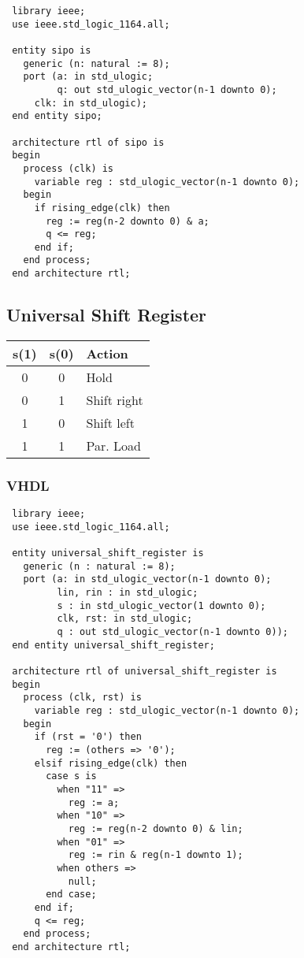 \documentclass[german, 10pt, a4paper, twocolumn]{scrartcl}
\theoremstyle{definition}
\begin{document}
\begin{verbatim}
 library ieee;
 use ieee.std_logic_1164.all;

 entity sipo is
   generic (n: natural := 8);
   port (a: in std_ulogic;
         q: out std_ulogic_vector(n-1 downto 0);
	 clk: in std_ulogic);
 end entity sipo;

 architecture rtl of sipo is
 begin
   process (clk) is
     variable reg : std_ulogic_vector(n-1 downto 0);
   begin
     if rising_edge(clk) then
       reg := reg(n-2 downto 0) & a;
       q <= reg;
     end if;
   end process;
 end architecture rtl;
\end{verbatim}

\subsection{Universal Shift Register}

\begin{tabular}{ccl}
	s(1) &		s(0) &		Action\\ \hline
	0 &		0 &		Hold\\
	0 &		1 &		Shift right\\
	1 &		0 &		Shift left\\
	1 &		1 &		Par. Load
\end{tabular}

\subsubsection{VHDL}

\small
\begin{verbatim}
 library ieee;
 use ieee.std_logic_1164.all;

 entity universal_shift_register is
   generic (n : natural := 8);
   port (a: in std_ulogic_vector(n-1 downto 0);
         lin, rin : in std_ulogic;
         s : in std_ulogic_vector(1 downto 0);
         clk, rst: in std_ulogic;
         q : out std_ulogic_vector(n-1 downto 0));
 end entity universal_shift_register;

 architecture rtl of universal_shift_register is
 begin
   process (clk, rst) is
     variable reg : std_ulogic_vector(n-1 downto 0);
   begin
     if (rst = '0') then
       reg := (others => '0');
     elsif rising_edge(clk) then
       case s is
         when "11" =>
           reg := a;
         when "10" =>
           reg := reg(n-2 downto 0) & lin;
         when "01" =>
           reg := rin & reg(n-1 downto 1);
         when others =>
           null;
       end case;
     end if;
     q <= reg;
   end process;
 end architecture rtl;
\end{verbatim}
\normalsize
\end{document}
